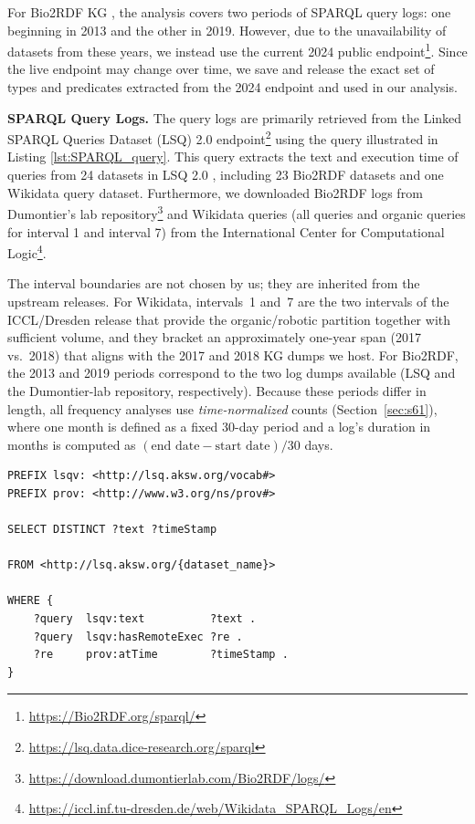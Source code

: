 \documentclass[sw]{iosart2x}
\begin{document}
For Bio2RDF KG \cite{belleau2008bio2rdf}, the analysis covers two periods of SPARQL query logs: one beginning in 2013 and the other in 2019. However, due to the unavailability of datasets from these years, we instead use the current 2024 public endpoint\footnote{\url{https://Bio2RDF.org/sparql/}}. Since the live endpoint may change over time, we save and release the exact set of types and predicates extracted from the 2024 endpoint and used in our analysis.

\textbf{SPARQL Query Logs. }
The query logs are primarily retrieved from the Linked SPARQL Queries Dataset (LSQ) 2.0 endpoint\footnote{\url{https://lsq.data.dice-research.org/sparql}} using the query illustrated in Listing \ref{lst:SPARQL_query}. This query extracts the text and execution time of queries from 24 datasets in LSQ 2.0 \cite{stadler2024lsq}, including 23 Bio2RDF datasets and one Wikidata query dataset.
Furthermore, we downloaded Bio2RDF logs from Dumontier’s lab repository\footnote{\url{https://download.dumontierlab.com/Bio2RDF/logs/}} and Wikidata queries (all queries and organic queries for interval 1 and interval 7) from the International Center for Computational Logic\footnote{\url{https://iccl.inf.tu-dresden.de/web/Wikidata_SPARQL_Logs/en}}.


The interval boundaries are not chosen by us; they are inherited from the upstream releases. For Wikidata, intervals~1 and~7 are the two intervals of the ICCL/Dresden release that provide the organic/robotic partition together with sufficient volume, and they bracket an approximately one-year span (2017 vs.\ 2018) that aligns with the 2017 and 2018 KG dumps we host. For Bio2RDF, the 2013 and 2019 periods correspond to the two log dumps available (LSQ and the Dumontier-lab repository, respectively). Because these periods differ in length, all frequency analyses use \emph{time-normalized} counts (Section~\ref{sec:s61}), where one month is defined as a fixed 30-day period and a log's duration in months is computed as $(\text{end date}-\text{start date})/30$ days.


\begin{center}
\begin{minipage}{0.8\textwidth}  %
\begin{lstlisting}[label={lst:SPARQL_query},linewidth=\linewidth, caption={The templated SPARQL query against the LSQ SPARQL endpoint to retrieve SPARQL queries for selected datasets.}]
PREFIX lsqv: <http://lsq.aksw.org/vocab#>
PREFIX prov: <http://www.w3.org/ns/prov#>

SELECT DISTINCT ?text ?timeStamp

FROM <http://lsq.aksw.org/{dataset_name}>

WHERE {
    ?query  lsqv:text          ?text .
    ?query  lsqv:hasRemoteExec ?re .
    ?re     prov:atTime        ?timeStamp .
}
\end{lstlisting}
\end{minipage}
\end{center}
\end{document}
